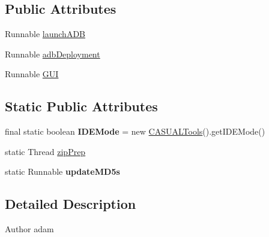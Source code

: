 \subsection*{Public Attributes}
\begin{DoxyCompactItemize}
\item 
Runnable \hyperlink{classCASUAL_1_1CASUALTools_ad38bf5c13e68a0c568594e95ab0ef15a}{launch\-A\-D\-B}
\item 
Runnable \hyperlink{classCASUAL_1_1CASUALTools_a5b0a4f18de75d5d15f59a073d9688d95}{adb\-Deployment}
\item 
Runnable \hyperlink{classCASUAL_1_1CASUALTools_a06e15c1a4ff6aaf8b3b81ff74afb5e2d}{G\-U\-I}
\end{DoxyCompactItemize}
\subsection*{Static Public Attributes}
\begin{DoxyCompactItemize}
\item 
\hypertarget{classCASUAL_1_1CASUALTools_a67fc8cae52fef252e4fff29730a415a2}{final static boolean {\bfseries I\-D\-E\-Mode} = new \hyperlink{classCASUAL_1_1CASUALTools}{C\-A\-S\-U\-A\-L\-Tools}().get\-I\-D\-E\-Mode()}\label{classCASUAL_1_1CASUALTools_a67fc8cae52fef252e4fff29730a415a2}

\item 
static Thread \hyperlink{classCASUAL_1_1CASUALTools_acc2a43a69c74b1f73df4ce08f2bad7bf}{zip\-Prep}
\item 
static Runnable {\bfseries update\-M\-D5s}
\end{DoxyCompactItemize}


\subsection{Detailed Description}
\begin{DoxyAuthor}{Author}
adam 
\end{DoxyAuthor}


